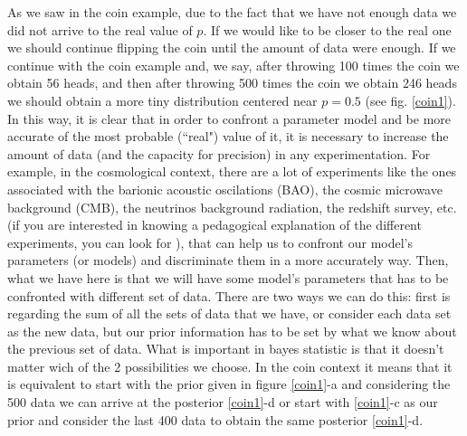 \documentclass[onecolumn,           %
               showpacs,            %
               preprintnumbers,     %
               aps,                 %
               prl,          	    %
               letterpaper,             %
               superscriptaddress,      %
               nofootinbib,         %
               tightenlines,        %
               floats,floatfix      %
               ,usenatbib,
               ]{revtex4-1}
\begin{document}
As we saw in the coin example, due to the fact that we have not enough data we did not arrive to the real value of $p$. If we would like to be closer to the real one we should continue flipping the coin until the amount of data were enough. If we continue with the coin example and, we say, after throwing 100 times the coin we obtain 56 heads, and then after throwing 500 times the coin we obtain 246 heads we should obtain a more tiny distribution centered near $p=0.5$ (see fig. \ref{coin1}). In this way, it is clear that in order to confront a parameter model and be more accurate of the most probable (``real") value of it, it is necessary to increase the amount of data (and the capacity for precision) in any experimentation. For example, in the cosmological context, there are a lot of experiments like the ones associated with the barionic acoustic oscilations (BAO), the cosmic microwave background (CMB), the neutrinos background radiation, the redshift survey, etc. (if you are interested in knowing a pedagogical explanation of the different experiments, you can look for \cite{observ}), that can help us to confront our model's parameters (or models) and discriminate them in a more accurately way. Then, what we have here is that we will have some model's parameters that has to be confronted with different set of data. There are two ways we can do this: first is regarding the sum of all the sets of data that we have, or consider each data set as the new data, but our prior information has to be set by what we know about the previous set of data. What is important in bayes statistic is that it doesn't matter wich of the 2 possibilities we choose. In the coin context it means that it is equivalent to start with the prior given in figure \ref{coin1}-a and considering the 500 data we can arrive at the posterior \ref{coin1}-d or start with \ref{coin1}-c as our prior and consider the last 400 data to obtain the same posterior \ref{coin1}-d. \\ $ $ \\
\end{document}
